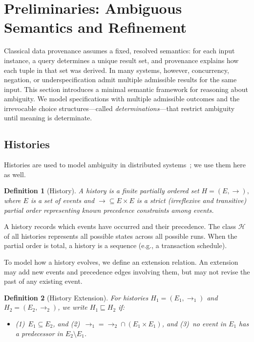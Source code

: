\documentclass[acmsmall,review,anonymous]{acmart}
\newcommand{\Hist}{\mathcal{H}}
\newtheorem{definition}{Definition}
\theoremstyle{remark}
\numberwithin{definition}{section}
\numberwithin{theorem}{section}
\numberwithin{lemma}{section}
\numberwithin{corollary}{section}
\numberwithin{remark}{section}
\numberwithin{example}{section}
\numberwithin{observation}{section}
\numberwithin{assumption}{section}
\begin{document}
\section{Preliminaries: Ambiguous Semantics and Refinement}
\label{sec:prelim}

Classical data provenance assumes a fixed, resolved semantics: for each input
instance, a query determines a unique result set, and provenance explains how
each tuple in that set was derived.
In many systems, however, concurrency, negation, or underspecification admit
multiple admissible results for the same input.
This section introduces a minimal semantic framework for reasoning about
ambiguity.
We model specifications with multiple admissible outcomes and the
irrevocable choice structures—called \emph{determinations}—that restrict ambiguity until
meaning is determinate.

\subsection{Histories}
Histories are used to model ambiguity in distributed systems~\cite{lamport};
we use them here as well.
\begin{definition}[History]
  A \emph{history} is a finite partially ordered set
  $
    H = (E, \rightarrow),
  $
  where $E$ is a set of events and $\rightarrow \subseteq E \times E$ is a strict
  (irreflexive and transitive) partial order representing known precedence constraints among events.
\end{definition}

\noindent
A history records which events have occurred and their precedence.
The class $\Hist$ of all histories represents all possible states across
all possible runs.
When the partial order is total, a history is a sequence (e.g., a
transaction schedule).

To model how a history evolves, we define an extension relation. An extension may add new events and precedence edges involving them, but
may not revise the past of any existing event.

\begin{definition}[History Extension]
  For histories $H_1=(E_1,\rightarrow_1)$ and $H_2=(E_2,\rightarrow_2)$, we write
  $H_1 \sqsubseteq H_2$ if:
  \begin{itemize}[nosep,leftmargin=*,label={}]
    \item (1)~$E_1 \subseteq E_2$, 
          \quad and
          \quad (2)~$\rightarrow_1 = \rightarrow_2 \cap (E_1 \times E_1)$, 
          \quad and
          \quad (3)~no event in $E_1$ has a predecessor in $E_2 \setminus E_1$.
  \end{itemize}
\end{definition}
\end{document}
